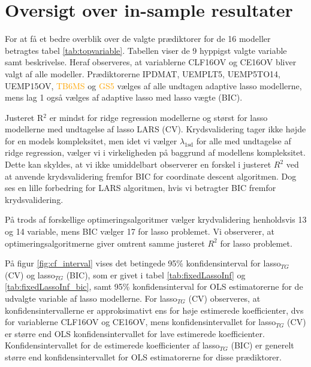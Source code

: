 \section{Oversigt over in-sample resultater} 
For at få et bedre overblik over de valgte prædiktorer for de 16 modeller betragtes tabel \ref{tab:topvariable}.
Tabellen viser de 9 hyppigst valgte variable samt beskrivelse. 
Heraf observeres, at variablerne \textcolor{blue3}{CLF16OV} og \textcolor{blue3}{CE16OV} bliver valgt af alle modeller.
Prædiktorerne \textcolor{chartreuse4}{IPDMAT}, \textcolor{blue3}{UEMPLT5}, \textcolor{blue3}{UEMP5TO14}, \textcolor{blue3}{UEMP15OV}, \textcolor{orange}{TB6MS} og \textcolor{orange}{GS5} vælges af alle undtagen adaptive lasso modellerne, mens \textcolor{blue3}{lag 1} også vælges af adaptive lasso med lasso vægte (BIC).



Justeret R$^2$ er mindst for ridge regression modellerne og størst for lasso modellerne med undtagelse af lasso LARS (CV).
Krydsvalidering tager ikke højde for en models kompleksitet, men idet vi vælger \(\lambda_\text{1sd}\) for alle med undtagelse af ridge regression, vælger vi i virkeligheden på baggrund af modellens kompleksitet.
Dette kan skyldes, at vi ikke umiddelbart observerer en forskel i justeret \(R^2\) ved at anvende krydsvalidering fremfor BIC for coordinate descent algoritmen.
Dog ses en lille forbedring for LARS algoritmen, hvis vi betragter BIC fremfor krydsvalidering.

På trods af forskellige optimeringsalgoritmer vælger krydvalidering henholdsvis 13 og 14 variable, mens BIC vælger 17 for lasso problemet.
Vi observerer, at optimeringsalgoritmerne giver omtrent samme justeret \(R^2\) for lasso problemet.


På figur \ref{fig:cf_interval} vises det betingede 95\% konfidensinterval for lasso\(_{TG}\) (CV) og lasso\(_{TG}\) (BIC), som er givet i tabel \ref{tab:fixedLassoInf} og \ref{tab:fixedLassoInf_bic}, samt 95\% konfidensinterval for OLS estimatorerne for de udvalgte variable af lasso modellerne. 
For lasso\(_{TG}\) (CV) observeres, at konfidensintervallerne er approksimativt ens for høje estimerede koefficienter, dvs for variablerne \textcolor{blue3}{CLF16OV} og \textcolor{blue3}{CE16OV}, mens  konfidensintervallet for lasso\(_{TG}\) (CV) er større end OLS konfidensintervallet for lave estimerede koefficienter.
Konfidensintervallet for de estimerede koefficienter af lasso\(_{TG}\) (BIC) er generelt større end konfidensintervallet for OLS estimatorerne for disse prædiktorer.

